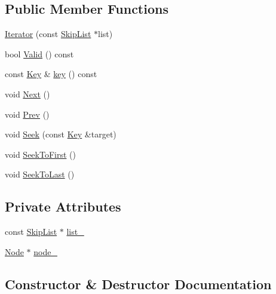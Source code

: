 \subsection*{Public Member Functions}
\begin{DoxyCompactItemize}
\item 
\hyperlink{classleveldb_1_1_skip_list_1_1_iterator_ab27d6dd0959d67ed26f2bd451c18270c}{Iterator} (const \hyperlink{classleveldb_1_1_skip_list}{Skip\+List} $\ast$list)
\item 
bool \hyperlink{classleveldb_1_1_skip_list_1_1_iterator_ac074827b7e9ded32283385e6228ef8cd}{Valid} () const 
\item 
const \hyperlink{namespaceleveldb_a7e9a9725b13fa0bd922d885280dfab95}{Key} \& \hyperlink{classleveldb_1_1_skip_list_1_1_iterator_a5d2a82038f440d557b32afb398c7eb57}{key} () const 
\item 
void \hyperlink{classleveldb_1_1_skip_list_1_1_iterator_ade5a684c74056f578f85237735da0cef}{Next} ()
\item 
void \hyperlink{classleveldb_1_1_skip_list_1_1_iterator_a10dbaf45640ab2b9f61a96c82e7227e5}{Prev} ()
\item 
void \hyperlink{classleveldb_1_1_skip_list_1_1_iterator_a6c641d5cd37386abdb0aa8d73454611a}{Seek} (const \hyperlink{namespaceleveldb_a7e9a9725b13fa0bd922d885280dfab95}{Key} \&target)
\item 
void \hyperlink{classleveldb_1_1_skip_list_1_1_iterator_adf69c04f0480a66f10a125c49e19caa7}{Seek\+To\+First} ()
\item 
void \hyperlink{classleveldb_1_1_skip_list_1_1_iterator_afe892ff436137b85216c2ed124f3c6dd}{Seek\+To\+Last} ()
\end{DoxyCompactItemize}
\subsection*{Private Attributes}
\begin{DoxyCompactItemize}
\item 
const \hyperlink{classleveldb_1_1_skip_list}{Skip\+List} $\ast$ \hyperlink{classleveldb_1_1_skip_list_1_1_iterator_a975880d27195f53ff0d0e599543b4aba}{list\+\_\+}
\item 
\hyperlink{structleveldb_1_1_skip_list_1_1_node}{Node} $\ast$ \hyperlink{classleveldb_1_1_skip_list_1_1_iterator_aca4dad33d2cb4c9ea3a16f2d5f164a42}{node\+\_\+}
\end{DoxyCompactItemize}


\subsection{Constructor \& Destructor Documentation}
\hypertarget{classleveldb_1_1_skip_list_1_1_iterator_ab27d6dd0959d67ed26f2bd451c18270c}{}
